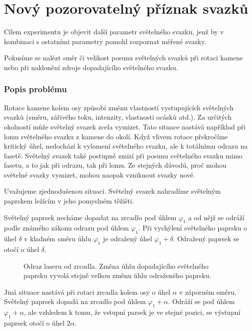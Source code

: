 \part{Nový pozorovatelný příznak svazků}

Cílem experimentu je objevit další parametr světelného svazku, jenž by v kombinaci s ostatními parametry pomohl rozpoznat měřené svazky. 

Pokusíme se nalézt směr či velikost posunu světelných svazků při rotaci kamene nebo při naklonění zdroje dopadajícího světelného svazku. 

\section{Popis problému}

Rotace kamene kolem osy způsobí změnu vlastností vystupujících světelných svazků (směru, zářivého toku, intenzity, vlastnosti ocásků atd.). Za určitých okolností může světelný svazek zcela vymizet. Tato situace nastává například při lomu světelného svazku z kamene do okolí. Když vlivem rotace překročíme kritický úhel, nedochází k vylomení světelného svazku, ale k totálnímu odrazu na fasetě. Světelný svazek také postupně zmizí při posunu světelného svazku mimo fasetu, a to jak při odrazu, tak při lomu. Ze stejných důvodů, proč mohou světelné svazky vymizet, mohou naopak vzniknout svazky nové.

Uvažujeme zjednodušenou situaci. Světelný svazek nahradíme světelným paprskem ležícím v jeho pomyslném těžišti. 

Světelný paprsek necháme dopadat na zrcadlo pod úhlem $\varphi_1$ a od nějž se odráží podle známého zákonu odrazu pod úhlem $\varphi_1$. Při vychýlení světelného paprsku o úhel $ \delta $ v kladném směru úhlu $\varphi_1$ je odražený úhel $\varphi_1 + \delta$. Odražený paprsek se otočí o úhel $ \delta $.

\begin{figure}[h!]
\begin{center}
\scalebox{1}{ }
\end{center}
\caption{Odraz laseru od zrcadla. Změna úhlu dopadajícího světelného paprsku vyvolá stejně velkou změnu úhlu odraženého paprsku.}
\label{fig:odraz laser}
\end{figure}

Jiná situace nastává při rotaci zrcadla kolem osy o úhel $\alpha$ v záporném směru. Světelný paprsek dopadá na zrcadlo pod úhlem $\varphi_1 + \alpha$. Odráží se pod úhlem $\varphi_1+\alpha$, ale vzhledem k tomu, že vstupní parsek je ve stejné pozici, se výstupní paprsek otočí o úhel  $2\alpha$. 


